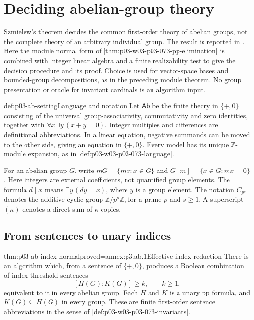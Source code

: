 \section{Deciding abelian-group theory}
\label{sec:p03-abelian-decision}

Szmielew's theorem decides the common first-order theory of abelian groups,
not the complete theory of an arbitrary individual group. The result is
reported in \cite[p.~611, Theorem~7]{Rabin1977Decidable}. Here the module
normal form of \cref{thm:p03-w03-p03-073-pp-elimination} is combined with
integer linear algebra and a finite realizability test to give the
decision procedure and its proof. Choice is used for vector-space bases
and bounded-group decompositions, as in the preceding module theorem.
No group presentation or oracle for invariant cardinals is an algorithm input.

\begin{hbdefinition}{def:p03-ab-setting}{Language and notation}
Let \(\mathsf{Ab}\) be the finite theory in \(\{+,0\}\) consisting of the
universal group-associativity, commutativity and zero identities, together
with \(\forall x\,\exists y\,(x+y=0)\). Integer multiples and differences
are definitional abbreviations. In a linear equation, negative summands
can be moved to the other side, giving an equation in \(\{+,0\}\).
Every model has its unique \(\mathbb Z\)-module expansion, as in
\cref{def:p03-w03-p03-073-language}.

For an abelian group \(G\), write \(mG=\{mx:x\in G\}\) and
\(G[m]=\{x\in G:mx=0\}\). Here integers are external coefficients,
not quantified group elements. The formula \(d\mid x\) means
\(\exists y\,(dy=x)\), where \(y\) is a group element.
The notation \(C_{p^s}\) denotes the additive cyclic group
\(\mathbb Z/p^s\mathbb Z\), for a prime \(p\) and \(s\geq1\).
A superscript \((\kappa)\) denotes a direct sum of \(\kappa\) copies.
\end{hbdefinition}

\subsection{From sentences to unary indices}

\begin{hblemma}{thm:p03-ab-index-normal}{proved=annex:p3.ab.1}{Effective index reduction}
There is an algorithm which, from a sentence of \(\{+,0\}\), produces
a Boolean combination of index-threshold sentences
\[
 [H(G):K(G)]\geq k,
 \qquad k\geq1,
\]
equivalent to it in every abelian group. Each \(H\) and \(K\) is a unary
pp formula, and \(K(G)\subseteq H(G)\) in every group. These are finite
first-order sentence abbreviations in the sense of
\cref{def:p03-w03-p03-073-invariants}.
\end{hblemma}

